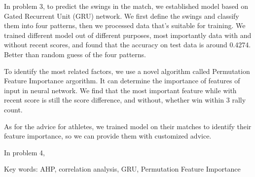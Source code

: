 In problem 3, to predict the swings in the match, we established model based on Gated Recurrent Unit (GRU) network.
We first define the swings and classify them into four patterns, then we processed data that's suitable for training.
We trained different model out of different purposes, most importantly data with and without recent scores, 
and found that the accuracy on test data is around 0.4274.
Better than random guess of the four patterns.

To identify the most related factors, we use a novel algorithm called Permutation Feature Importance argorithm.
It can determine the importance of features of input in neural network. We find that the most important feature while
with recent score is still the score difference, and without, whether win within 3 rally count.

As for the advice for athletes, we trained model on their matches to identify their feature importance,
so we can provide them with customized advice.

In problem 4, 

Key words: AHP, correlation analysis, GRU, Permutation Feature Importance